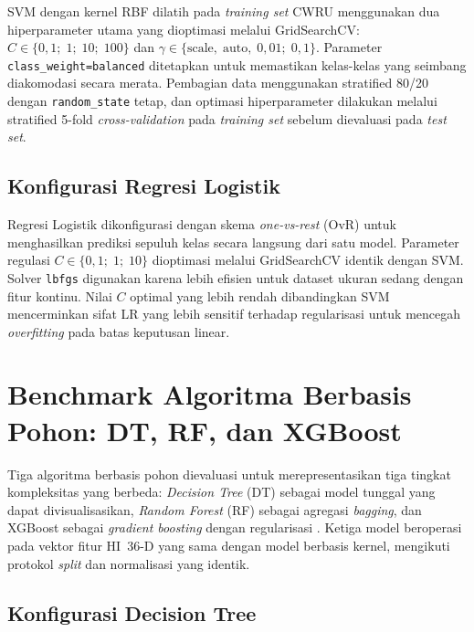 SVM dengan kernel RBF dilatih pada \emph{training set} CWRU menggunakan
dua hiperparameter utama yang dioptimasi melalui GridSearchCV:
$C \in \{0{,}1;\; 1;\; 10;\; 100\}$ dan
$\gamma \in \{\text{scale},\; \text{auto},\; 0{,}01;\; 0{,}1\}$.
Parameter \texttt{class\_weight=\textquotesingle balanced\textquotesingle}
ditetapkan untuk memastikan kelas-kelas yang seimbang diakomodasi secara merata.
Pembagian data menggunakan stratified 80/20 dengan \texttt{random\_state}
tetap, dan optimasi hiperparameter dilakukan melalui stratified 5-fold
\emph{cross-validation} pada \emph{training set} sebelum dievaluasi pada
\emph{test set}.

\subsection{Konfigurasi Regresi Logistik}
\label{subsec:bab4_lr_config}

Regresi Logistik dikonfigurasi dengan skema \emph{one-vs-rest} (OvR) untuk
menghasilkan prediksi sepuluh kelas secara langsung dari satu model.
Parameter regulasi $C \in \{0{,}1;\; 1;\; 10\}$ dioptimasi melalui
GridSearchCV identik dengan SVM.
Solver \texttt{lbfgs} digunakan karena lebih efisien untuk dataset ukuran
sedang dengan fitur kontinu.
Nilai $C$ optimal yang lebih rendah dibandingkan SVM mencerminkan sifat LR
yang lebih sensitif terhadap regularisasi untuk mencegah \emph{overfitting}
pada batas keputusan linear.

\section{Benchmark Algoritma Berbasis Pohon: DT, RF, dan XGBoost}
\label{sec:bab4_tree}

Tiga algoritma berbasis pohon dievaluasi untuk merepresentasikan tiga
tingkat kompleksitas yang berbeda: \emph{Decision Tree} (DT) sebagai model
tunggal yang dapat divisualisasikan, \emph{Random Forest} (RF) sebagai
agregasi \emph{bagging}, dan XGBoost sebagai \emph{gradient boosting} dengan
regularisasi .
Ketiga model beroperasi pada vektor fitur HI~36-D yang sama dengan model
berbasis kernel, mengikuti protokol \emph{split} dan normalisasi yang identik.

\subsection{Konfigurasi Decision Tree}
\label{subsec:bab4_dt_config}

